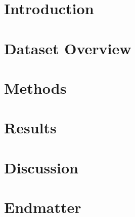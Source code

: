 \documentclass{statsmsc}
\begin{document}
\mainmatter

%

\section{Introduction}

\section{Dataset Overview}
\label{sec: data}

\section{Methods}\label{sec:methods}

\section{Results}
\label{sec:results}


\section{Discussion}
\label{sec:discussion}



\section*{Endmatter} \label{sec:endmatter}


%
%
%
%
%
%

%
%

\clearpage

 



\clearpage
\end{document}
